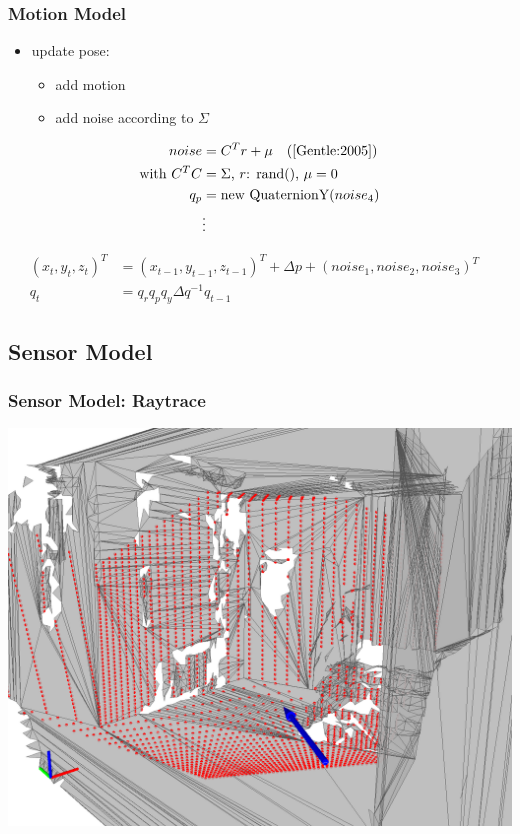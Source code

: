 \documentclass{beamer}
\begin{document}
\begin{frame}
  \frametitle{Motion Model}
  
  \begin{multicols}{2}
    \parbox{.5\textwidth}{
      \begin{itemize}
        \item update pose:
        \begin{itemize}
          \item add motion
          \item add noise according to $\Sigma$
        \end{itemize}
      \end{itemize}
      \begin{align*}
        noise &= C^T r + \mu \text{\ \ \ (\cite{Gentle:2005})}\\
        \text{with } C^TC&=\Sigma \text{, $r$: rand(), $\mu = 0$} \\
        q_p &= \text{new QuaternionY(}noise_4\text{)} \\
            &\vdots
      \end{align*}
    }
    
  \end{multicols}

  \begin{align*}
    (x_t,y_t,z_t)^T &= (x_{t-1},y_{t-1},z_{t-1})^T + \Delta p + (noise_1,noise_2,noise_3)^T&\\
    q_t &= q_{r}q_pq_y\Delta q^{-1}q_{t-1}&
  \end{align*}
  

\end{frame}


\subsection{Sensor Model}

\begin{frame}
  \frametitle{Sensor Model: Raytrace}
	\begin{center}
    \includegraphics[width=.8\textwidth]{../pics/example_raytrace}
  \end{center}
\end{frame}
\end{document}
